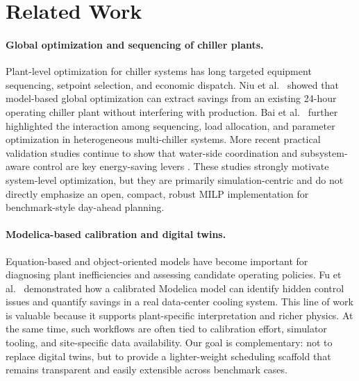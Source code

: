\section{Related Work}
\label{sec:related}

\paragraph{Global optimization and sequencing of chiller plants.}
Plant-level optimization for chiller systems has long targeted equipment sequencing, setpoint selection, and economic dispatch. Niu et al.~\citep{niu2023global} showed that model-based global optimization can extract savings from an existing 24-hour operating chiller plant without interfering with production. Bai et al.~\citep{bai2024modelica} further highlighted the interaction among sequencing, load allocation, and parameter optimization in heterogeneous multi-chiller systems. More recent practical validation studies continue to show that water-side coordination and subsystem-aware control are key energy-saving levers \citep{kong2025industrial}. These studies strongly motivate system-level optimization, but they are primarily simulation-centric and do not directly emphasize an open, compact, robust MILP implementation for benchmark-style day-ahead planning.

\paragraph{Modelica-based calibration and digital twins.}
Equation-based and object-oriented models have become important for diagnosing plant inefficiencies and assessing candidate operating policies. Fu et al.~\citep{fu2019equation} demonstrated how a calibrated Modelica model can identify hidden control issues and quantify savings in a real data-center cooling system. This line of work is valuable because it supports plant-specific interpretation and richer physics. At the same time, such workflows are often tied to calibration effort, simulator tooling, and site-specific data availability. Our goal is complementary: not to replace digital twins, but to provide a lighter-weight scheduling scaffold that remains transparent and easily extensible across benchmark cases.

